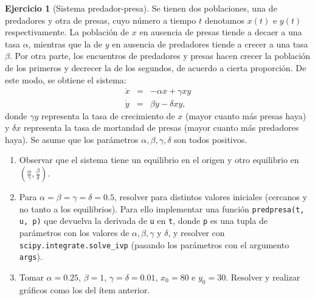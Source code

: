 \documentclass[12pt, a4paper]{amsbook}
\theoremstyle{remark}
\theoremstyle{definition}
\newtheorem{ejer}[teo]{Ejercicio}
\numberwithin{section}{chapter}
\numberwithin{subsection}{section}
\numberwithin{equation}{section}
\numberwithin{figure}{chapter}
\begin{document}
\begin{ejer}[Sistema predador-presa] \label{predpresa}
Se tienen dos poblaciones, una de predadores y otra de presas, cuyo número a tiempo $t$ denotamos $x(t)$ e $y(t)$ respectivamente. La población de $x$ en ausencia de presas tiende a decaer a una tasa $\alpha$, mientras que la de $y$ en ausencia de predadores tiende a crecer a una tasa $\beta$. Por otra parte, los encuentros de predadores y presas hacen crecer la población de los primeros y decrecer la de los segundos, de acuerdo a cierta proporción. De este modo, se obtiene el sistema:
$$\begin{array}{rcl}
\dot{x} &=& -\alpha x + \gamma xy \\
\dot{y} &=& \beta y - \delta xy,
\end{array}$$
donde $\gamma y$ representa la tasa de crecimiento de $x$ (mayor cuanto más presas haya) y $\delta x$ representa la tasa de mortandad de presas (mayor cuanto más predadores haya). Se asume que los parámetros $\alpha,\beta,\gamma,\delta$ son todos positivos. 

\begin{enumerate}
\item Observar que el sistema tiene un equilibrio en el origen y otro equilibrio en $(\frac{\alpha}{\gamma},\frac{\beta}{\delta})$. 
\item Para $\alpha=\beta=\gamma=\delta=0.5$, resolver para distintos valores iniciales (cercanos y no tanto a los equilibrios). Para ello implementar una función \lstinline{predpresa(t, u, p)} que devuelva la derivada de \lstinline{u} en \lstinline{t}, donde \lstinline{p} es una tupla de parámetros con los valores de $\alpha,\beta,\gamma$ y $\delta$, y resolver con \lstinline{scipy.integrate.solve_ivp} (pasando los parámetros con el argumento \lstinline{args}).  
\item Tomar $\alpha = 0.25$, $\beta=1$, $\gamma=\delta=0.01$, $x_0 = 80$ e $y_0=30$. Resolver y realizar gráficos como los del ítem anterior. 
\end{enumerate}
\end{ejer}
\end{document}
